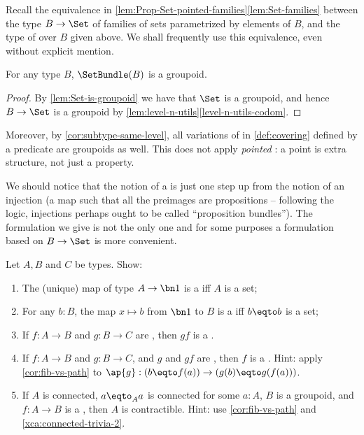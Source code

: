 Recall the equivalence in \cref{lem:Prop-Set-pointed-families}\ref{lem:Set-families}
between the type $B\to\Set$ of families of sets parametrized by elements of $B$, and the type
of \coverings over $B$ given above.
We shall frequently use this equivalence, even without explicit mention.

\begin{lemma}\label{lem:setbundle-is-groupoid}
For any type $B$, $\SetBundle(B)$ is a groupoid.
\end{lemma}
\begin{proof}
By \cref{lem:Set-is-groupoid} we have that $\Set$ is a groupoid,
and hence $B\to\Set$ is a groupoid by 
\cref{lem:level-n-utils}\ref{level-n-utils-codom}.
\end{proof}
Moreover, by \cref{cor:subtype-same-level}, all variations 
of \coverings in \cref{def:covering}
defined by a predicate are groupoids as well. This does not apply
\emph{pointed} \coverings:
a point is extra structure, not just a property.

We should notice that the notion of a \covering is just one step up from the notion of an
injection (a map such that all the preimages are propositions --
following the logic, injections perhaps ought to be called ``proposition bundles'').
The formulation we give is not the only one and for some purposes a formulation
based on $B\to\Set$ is more convenient.

\begin{xca}\label{xca:covering-utils}
Let $A,B$ and $C$ be types. Show:
\begin{enumerate}
\item The (unique) map of type $A\to\bn 1$ is a \covering iff $A$ is a set;
\item For any $b:B$, the map $x \mapsto b$ from $\bn 1$ to $B$ is
a \covering iff $b\eqto b$ is a set;
\item If $f: A\to B$ and $g: B\to C$ are \coverings, then $gf$ is a \covering.
\item\label{it:left-cancel-cover}
If $f: A\to B$ and $g: B\to C$, and $g$ and $gf$ are \coverings, 
then $f$ is a \covering. Hint: apply \cref{cor:fib-vs-path} to
$\ap{g}: (b\eqto f(a))\to(g(b)\eqto g(f(a)))$.
\item If $A$ is connected, $a\eqto_A a$ is connected for some $a:A$,
$B$ is a groupoid, and $f: A\to B$ is a \covering, then $A$ is contractible.
Hint: use \cref{cor:fib-vs-path} and \cref{xca:connected-trivia-2}.\qedhere
\end{enumerate}
\end{xca}

